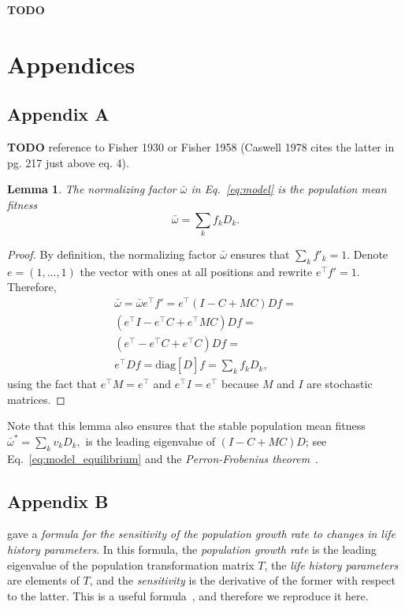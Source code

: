 \documentclass[9pt, a4paper, twocolumn]{extarticle}   	%
\newcommand*{\tr}{^\intercal}
\newcommand{\matrx}[1]{{\left[ \stackrel{}{#1}\right]}}
\newcommand{\diag}[1]{\mbox{diag}\matrx{#1}}
\newtheorem*{lemma}{Lemma}
\begin{document}
\textbf{TODO}

\section*{Appendices}
\subsection*{Appendix A}\label{sec:AppA}
\textbf{TODO} reference to Fisher 1930 or Fisher 1958 (Caswell 1978 cites the latter in pg. 217 just above eq. 4).

\begin{lemma}
The normalizing factor $\bar{\omega}$ in Eq.~\ref{eq:model} is the population mean fitness
\begin{equation}
\bar{\omega} = \sum_k{f_k D_k}.
\end{equation}
\end{lemma}

\begin{proof}
By definition, the normalizing factor $\bar{\omega}$ ensures that $\sum_k{f'_k}=1$.
Denote $e = (1, ..., 1)$ the vector with ones at all positions and rewrite $e\tr f' = 1$.
Therefore, 
\begin{multline}\label{eq:mean_fitness}
\bar{\omega} = 
\bar{\omega} e\tr f' = 
e\tr (I - C + M C) D f = \\
(e\tr I - e\tr C + e\tr M C) D f = \\
(e\tr - e\tr C + e\tr C) D f = \\
e\tr D f = 
\diag{D} f = 
\sum_k{f_k D_k},
\end{multline}
using the fact that $e\tr M = e\tr$ and $e\tr I = e\tr$ because $M$ and $I$ are stochastic matrices.
\end{proof}

Note that this lemma also ensures that the stable population mean fitness $\bar{\omega}^*=\sum_k{v_k D_k},$ is the leading eigenvalue of $(I - C + M C) D$; see Eq.~\ref{eq:model_equilibrium} and the \emph{Perron-Frobenius theorem}~\cite[Appendix~A]{Otto2007}.

\subsection*{Appendix B}\label{sec:AppB}

\citet{Caswell1978} gave a \emph{formula for the sensitivity of the population growth rate to changes in life history parameters}.
In this formula, the \emph{population growth rate} is the leading eigenvalue of the population transformation matrix $T$, the \emph{life history parameters} are elements of $T$, and the \emph{sensitivity} is the derivative of the former with respect to the latter.
This is a useful formula~\citep{Caswell1978,Hermisson2002,Ram2012}, and therefore we reproduce it here.
\end{document}

